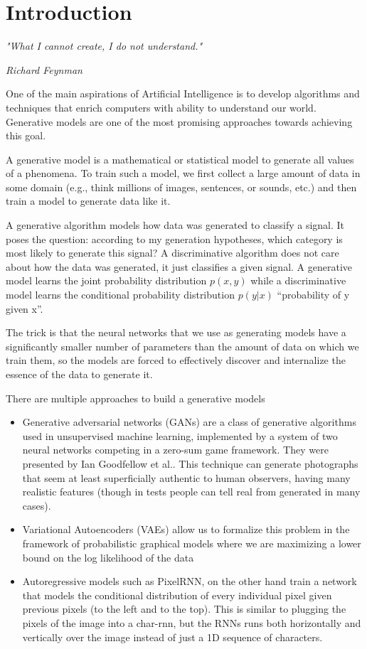\chapter{Introduction}\label{ch:introduction}

\epigraph{\textit{\Large "What I cannot create, I do not understand."}}{\textit{ \Large Richard Feynman}}
One of the main aspirations of Artificial Intelligence is to develop algorithms and techniques that enrich computers with ability to understand our world. Generative models are one of the most promising approaches towards achieving this goal.\par\bigskip
A generative model is a mathematical or statistical model to generate all values of a phenomena. To train such a model, we first collect a large amount of data in some domain (e.g., think millions of images, sentences, or sounds, etc.) and then train a model to generate data like it.\par\bigskip
A generative algorithm models how data was generated to classify a signal. It poses the question: according to my generation hypotheses, which category is most likely to generate this signal? A discriminative algorithm does not care about how the data was generated, it just classifies a given signal. A generative model learns the joint probability distribution $p(x,y)$ while a discriminative model learns the conditional probability distribution $p(y|x)$ “probability of y given x”.\par\bigskip
The trick is that the neural networks that we use as generating models have a significantly smaller number of parameters than the amount of data on which we train them, so the models are forced to effectively discover and internalize the essence of the data to generate it.\par\bigskip
There are multiple approaches to build a generative models
\begin{itemize}
  \item Generative adversarial networks (GANs) are a class of generative algorithms used in unsupervised machine learning, implemented by a system of two neural networks competing in a zero-sum game framework. They were presented by Ian Goodfellow et al.\cite{gan}. This technique can generate photographs that seem at least superficially authentic to human observers, having many realistic features (though in tests people can tell real from generated in many cases).
  \item Variational Autoencoders (VAEs) allow us to formalize this problem in the framework of probabilistic graphical models where we are maximizing a lower bound on the log likelihood of the data
  \item Autoregressive models such as PixelRNN, on the other hand train a network that models the conditional distribution of every individual pixel given previous pixels (to the left and to the top). This is similar to plugging the pixels of the image into a char-rnn, but the RNNs runs both horizontally and vertically over the image instead of just a 1D sequence of characters.
\end{itemize} \par
